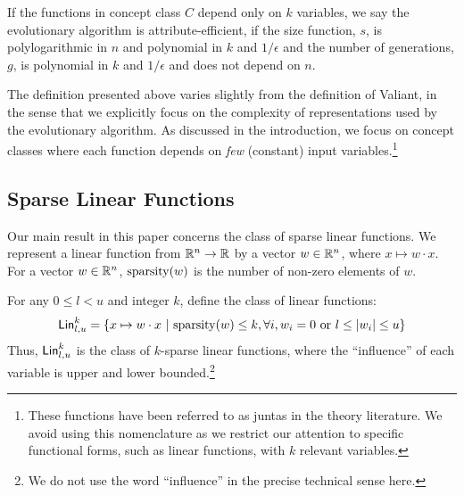 \begin{remark} If the functions in concept class $C$ depend only on $k$
variables, we say the evolutionary algorithm is attribute-efficient, if the size
function, $s$, is polylogarithmic in $n$ and polynomial in $k$ and $1/\epsilon$
and the number of generations, $g$, is polynomial in $k$ and $1/\epsilon$ and
does not depend on $n$.
\end{remark}

The definition presented above varies slightly from the definition of Valiant,
in the sense that we explicitly focus on the complexity of representations used
by the evolutionary algorithm. As discussed in the introduction, we focus on
concept classes where each function depends on \emph{few} (constant) input
variables.\footnote{These functions have been referred to as juntas in the
theory literature. We avoid using this nomenclature as we restrict our attention
to specific functional forms, such as linear functions, with $k$ relevant
variables.} 


\subsection{Sparse Linear Functions} 
\label{sec:notation-class}

Our main result in this paper concerns the class of sparse linear functions.  We
represent a linear function from $\mathbb{R}^n \rightarrow \mathbb{R}$ by a vector $w
\in \mathbb{R}^n$, where $x \mapsto w \cdot x$.  For a vector $w \in \mathbb{R}^n$,
$\mathrm{sparsity}(w)$ is the number of non-zero elements of $w$.

For any $0 \leq l < u$ and integer $k$, define the class of linear functions:
\[
\mathsf{Lin}^k_{l, u} = \{ x \mapsto w \cdot x ~|~ \mathrm{sparsity}(w) \leq k, \forall i,
w_i = 0 \mbox{ or } l \leq |w_i| \leq u \}
\]
Thus, $\mathsf{Lin}^k_{l, u}$ is the class of $k$-sparse linear functions, where the
``influence'' of each variable is upper and lower bounded.\footnote{We do not
use the word ``influence'' in the precise technical sense here.}

